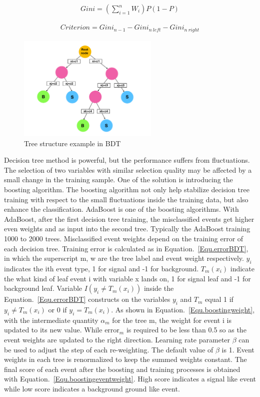 \begin{align}\label{Equ.BDTGini} 
Gini=(\sum_{i=1}^{n}W_{i})P(1-P)
\end{align}

\begin{align}\label{Equ.BDTtreecriterion} 
Criterion=Gini_{n-1}-Gini_{n \ left}-Gini_{n \ right}
\end{align}


\begin{figure}[!tbp] 
\centering
\includegraphics[width=0.6\textwidth]{chapter7/BDT_tree_show.pdf}
\caption{Tree structure example in BDT}
\label{fig:BDTtreestructure}
\end{figure}

Decision tree method is powerful, but the performance suffers from fluctuations. The selection of two variables with similar selection quality may be affected by a small change in the training sample. One of the solution is introducing the boosting algorithm. The boosting algorithm not only help stabilize decision tree training with respect to the small fluctuations inside the training data, but also enhance the classification.  AdaBoost is one of the boosting algorithms. With AdaBoost, after the first decision tree training, the misclassified events get higher even weights and as input into the second tree. Typically the AdaBoost training 1000 to 2000 trees. Misclassified event weights depend on the training error of each decision tree. Training error is calculated as in Equation.~\ref{Equ.errorBDT}, in which the superscript m, w are the tree label and event weight respectively. $y_{i}$ indicates the ith event type, 1 for signal and -1 for background. $T_{m}(x_{i})$ indicate the what kind of leaf event i with variable x lands on, 1 for signal leaf and -1 for background leaf. Variable $I(y_{i}\neq T_{m}(x_{i}))$ inside the Equation.~\ref{Equ.errorBDT} constructs on the variables $y_{i}$ and $T_{m}$ equal 1 if $y_{i}\neq T_{m}(x_{i})$ or 0 if $y_{i}= T_{m}(x_{i})$. As shown in Equation.~\ref{Equ.boostingweight}, with the intermediate quantity $\alpha_{m}$ for the tree m, the weight for event i is updated to its new value. While $\textrm{error}_{m}$ is required to be less than 0.5 so as the event weights are updated to the right direction. Learning rate parameter $\beta$ can be used to adjust the step of each re-weighting. The default value of $\beta$ is 1. Event weights in each tree is renormalized to keep the summed weights constant. The final score of each event after the boosting and training processes is obtained with Equation.~\ref{Equ.boostingeventweight}. High score indicates a signal like event while low score indicates a background ground like event.



